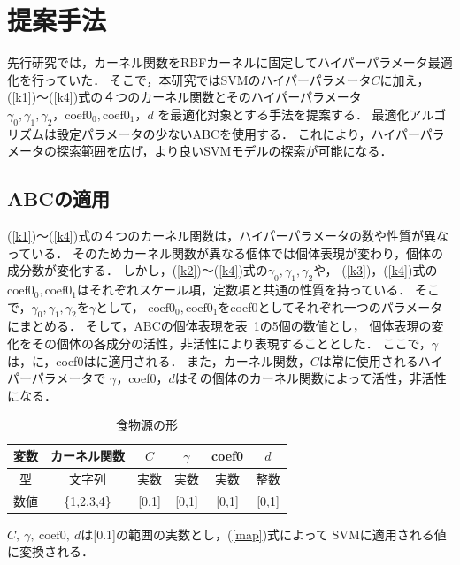 \section{提案手法}
先行研究では，カーネル関数をRBFカーネルに固定してハイパーパラメータ最適化を行っていた．
そこで，本研究ではSVMのハイパーパラメータ$C$に加え，
(\ref{k1})〜(\ref{k4})式の４つのカーネル関数とそのハイパーパラメータ$\gamma_0,\gamma_1,\gamma_2，\text{coef0}_0,\text{coef0}_1，d$
を最適化対象とする手法を提案する．
最適化アルゴリズムは設定パラメータの少ないABCを使用する．
これにより，ハイパーパラメータの探索範囲を広げ，より良いSVMモデルの探索が可能になる．
\subsection{ABCの適用}
(\ref{k1})〜(\ref{k4})式の４つのカーネル関数は，ハイパーパラメータの数や性質が異なっている．
そのためカーネル関数が異なる個体では個体表現が変わり，個体の成分数が変化する．
しかし，(\ref{k2})〜(\ref{k4})式の$\gamma_0,\gamma_1,\gamma_2$や，
(\ref{k3})，(\ref{k4})式の$\text{coef0}_0,\text{coef0}_1$はそれぞれスケール項，定数項と共通の性質を持っている．
そこで，$\gamma_0,\gamma_1,\gamma_2$を$\gamma$として，
$\text{coef0}_0,\text{coef0}_1$をcoef0としてそれぞれ一つのパラメータにまとめる．
そして，ABCの個体表現を表~\ref{tab:variables}の5個の数値とし，
個体表現の変化をその個体の各成分の活性，非活性により表現することとした．
ここで，$\gamma$は，に，coef0はに適用される．
また，カーネル関数，$C$は常に使用されるハイパーパラメータで
$\gamma$，coef0，$d$はその個体のカーネル関数によって活性，非活性になる．
\begin{table}[h]
    \centering
    \renewcommand{\arraystretch}{0.9} %
    \caption{食物源の形}
    \begin{tabular}{|c|c|c|c|c|c|}
      \hline
      変数           & カーネル関数 & $C$ &$ \gamma$ & coef0& $d$\\ \hline
      型       & 文字列              & 実数           & 実数                   & 実数           & 整数          \\ \hline
      数値          & \{1,2,3,4\}              & [0,1]           & [0,1]                  & [0,1]           & [0,1]          \\ \hline
      \end{tabular}
    
    \label{tab:variables}
    \end{table}
$C,~\gamma,~\text{coef0},~d$は[0.1]の範囲の実数とし，(\ref{map})式によって
SVMに適用される値に変換される．
